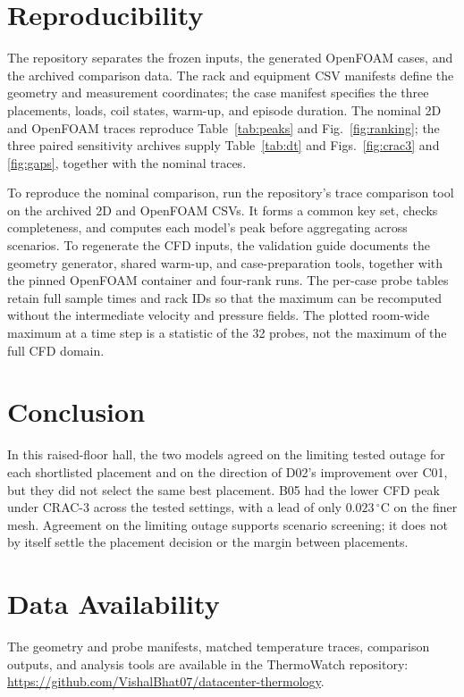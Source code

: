 \documentclass{ieeeaccess}
\begin{document}
\section{Reproducibility}
The repository separates the frozen inputs, the generated OpenFOAM cases, and the archived comparison data. The rack and equipment CSV manifests define the geometry and measurement coordinates; the case manifest specifies the three placements, loads, coil states, warm-up, and episode duration. The nominal 2D and OpenFOAM traces reproduce Table~\ref{tab:peaks} and Fig.~\ref{fig:ranking}; the three paired sensitivity archives supply Table~\ref{tab:dt} and Figs.~\ref{fig:crac3} and \ref{fig:gaps}, together with the nominal traces.

To reproduce the nominal comparison, run the repository's trace comparison tool on the archived 2D and OpenFOAM CSVs. It forms a common key set, checks completeness, and computes each model's peak before aggregating across scenarios. To regenerate the CFD inputs, the validation guide documents the geometry generator, shared warm-up, and case-preparation tools, together with the pinned OpenFOAM container and four-rank runs. The per-case probe tables retain full sample times and rack IDs so that the maximum can be recomputed without the intermediate velocity and pressure fields. The plotted room-wide maximum at a time step is a statistic of the 32 probes, not the maximum of the full CFD domain.

\section{Conclusion}
In this raised-floor hall, the two models agreed on the limiting tested outage for each shortlisted placement and on the direction of D02's improvement over C01, but they did not select the same best placement. B05 had the lower CFD peak under CRAC-3 across the tested settings, with a lead of only $0.023\,^{\circ}\mathrm{C}$ on the finer mesh. Agreement on the limiting outage supports scenario screening; it does not by itself settle the placement decision or the margin between placements.

\section*{Data Availability}
The geometry and probe manifests, matched temperature traces, comparison outputs, and analysis tools are available in the ThermoWatch repository: \url{https://github.com/VishalBhat07/datacenter-thermology}.
\end{document}

